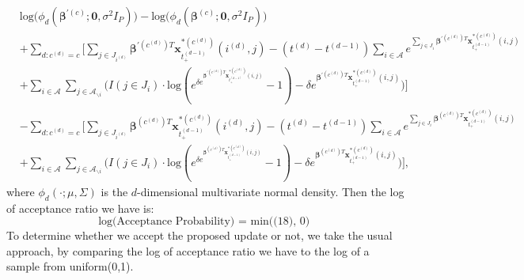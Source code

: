\documentclass[a4paper]{article}
\begin{document}
 \begin{equation}
 \begin{aligned} 
 &\mbox{log}\Big(\phi_d(\boldsymbol{\beta}^{\prime(c)};\mathbf{0}, \sigma^2I_P)\Big)-\mbox{log}\Big(\phi_d(\boldsymbol{\beta}^{(c)};\mathbf{0}, \sigma^2I_P)\Big)\\&+\sum_{d:c^{(d)}=c}\Big[\sum\limits_{j \in{J_{i^{(d)}}}}\boldsymbol{\beta}^{\prime(c^{(d)})T}\boldsymbol{x}^{*(c^{(d)})}_{t^{(d-1)}_+}(i^{(d)}, j)-(t^{(d)}-t^{(d-1)})\sum\limits_{i \in \mathcal{A}}e^{\sum\limits_{j \in{J_i}}\boldsymbol{\beta}^{\prime(c^{(d)})T}\boldsymbol{x}^{*(c^{(d)})}_{t^{(d-1)}_+}(i, j)}\\&+\sum\limits_{i\in \mathcal{A}}\sum\limits_{j \in \mathcal{A}_{\backslash i }}\Big(I(j \in J_i)\cdot\mbox{log}(e^{\delta e^{\boldsymbol{\beta}^{\prime(c^{(d)})T}\boldsymbol{x}^{*(c^{(d)})}_{t^{(d-1)}_+}(i, j)}}-1)-\delta e^{\boldsymbol{\beta}^{\prime(c^{(d)})T}\boldsymbol{x}^{*(c^{(d)})}_{t^{(d-1)}_+}(i, j)}\Big)\Big]\\&-\sum_{d:c^{(d)}=c} \Big[\sum\limits_{j \in{J_{i^{(d)}}}}\boldsymbol{\beta}^{(c^{(d)})T}\boldsymbol{x}^{*(c^{(d)})}_{t^{(d-1)}_+}(i^{(d)}, j)-(t^{(d)}-t^{(d-1)})\sum\limits_{i \in \mathcal{A}}e^{\sum\limits_{j \in{J_i}}\boldsymbol{\beta}^{(c^{(d)})T}\boldsymbol{x}^{*(c^{(d)})}_{t^{(d-1)}_+}(i, j)}\\&+\sum\limits_{i\in \mathcal{A}}\sum\limits_{j \in \mathcal{A}_{\backslash i }}\Big(I(j \in J_i)\cdot\mbox{log}(e^{\delta e^{\boldsymbol{\beta}^{(c^{(d)})T}\boldsymbol{x}^{*(c^{(d)})}_{t^{(d-1)}_+}(i, j)}}-1)-\delta e^{\boldsymbol{\beta}^{(c^{(d)})T}\boldsymbol{x}^{*(c^{(d)})}_{t^{(d-1)}_+}(i, j)}\Big)\Big],
 \end{aligned}
 \end{equation}
 where $\phi_d(\cdot;\mu, \Sigma)$ is the $d$-dimensional multivariate normal density.
 Then the log of acceptance ratio we have is:
 \begin{equation}
 \mbox{log(Acceptance Probability) = min((18), 0) }
 \end{equation}
 To determine whether we accept the proposed update or not, we take the usual approach, by comparing the log of acceptance ratio we have to the log of a sample from uniform(0,1).\\
\end{document}
